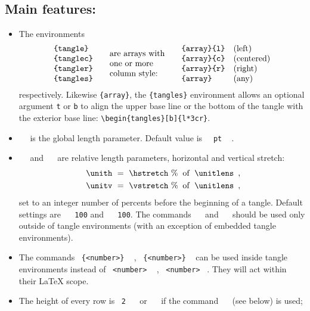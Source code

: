 \documentclass[11pt]{article}
\def\command#1{\ \hbox{\tt\string#1} \ }
\begin{document}
\subsection*{Main features:}
\begin{itemize}
\item
The environments
$$
\vcenter{\hbox{\tt \{tangle\}}
         \hbox{\tt \{tanglec\}}
         \hbox{\tt \{tangler\}}
         \hbox{\tt \{tangles\}}}
\qquad
\vcenter{\hbox{are arrays with}
         \hbox{one or more}
         \hbox{column style:}}
\qquad
\vcenter{\hbox{\tt \{array\}\{l\}}
         \hbox{\tt \{array\}\{c\}}
         \hbox{\tt \{array\}\{r\}}
         \hbox{\tt \{array\}}   }
\quad
\vcenter{\hbox{(left)}
         \hbox{(centered)}
         \hbox{(right)}
         \hbox{(any)}}
$$
respectively. Likewise {\tt \{array\}}, the {\tt \{tangles\}}
environment allows an optional argument {\tt t} or {\tt b} to align
the upper base line or the bottom of the tangle with the exterior
base line: \verb+\begin{tangles}[b]{l*3cr}+.
\item
 \command\unitlens is the global length parameter.
 Default value is  \command{10 pt} .
\item
 \command\hstretch and \command\vstretch are relative length
 parameters, horizontal and vertical stretch:
\begin{equation*}
\begin{split}
\command\unith = \command\hstretch \%\;\; \text{of}\; \command\unitlens \,,
\\
\command\unitv = \command\vstretch \%\;\; \text{of}\; \command\unitlens \,,
\end{split}
\end{equation*}
 set to an integer number of percents before the beginning of a tangle.
\newline
 Default settings are
\command{\hstretch}{\tt 100} and   \command{\vstretch}{\tt 100}.
 The commands \command\hstretch and \command\vstretch should be used only
 outside of tangle environments (with an exception of embedded tangle
 environments).
\item
The commands \command{\hstr \{<number>\}} ,
\command{\vstr \{<number>\}} can be used inside tangle environments
instead of \command{\hstretch <number>} , \command{\vstretch <number>}.
They will act within their \LaTeX{} scope.
\item
The height of every row is \ {\tt 2}\command\unitv
or \command\unitv  if the command \command\hh (see below) is used;

\end{itemize}
\end{document}
